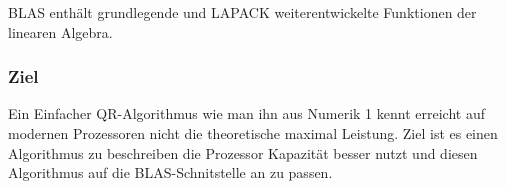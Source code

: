 BLAS enthält grundlegende und LAPACK weiterentwickelte Funktionen der linearen Algebra.

\subsubsection{Ziel}

Ein Einfacher QR-Algorithmus wie man ihn aus Numerik 1 kennt erreicht auf  		modernen Prozessoren nicht die theoretische maximal Leistung. 
Ziel ist es einen Algorithmus zu beschreiben die Prozessor Kapazität besser nutzt und diesen Algorithmus auf die BLAS-Schnitstelle an zu passen.








